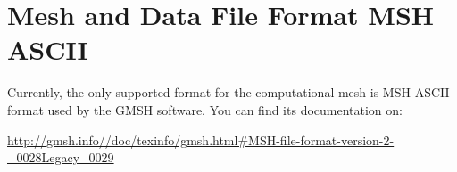%
%
%
%


\section{Mesh and Data File Format MSH ASCII}
\label{mesh_file}

Currently, the only supported format for the computational mesh is MSH ASCII format used
by the GMSH software. You can find its documentation on:

\url{http://gmsh.info//doc/texinfo/gmsh.html#MSH-file-format-version-2-_0028Legacy_0029}

